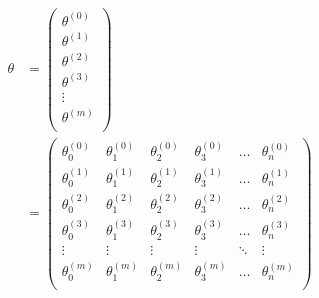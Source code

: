 \documentclass[12pt]{article}   %
\begin{document}
\begin{equation}
\begin{aligned}
\theta & = 
	\left(
		\begin{matrix}
			\theta^{(0)} \\
			\theta^{(1)} \\
			\theta^{(2)} \\
			\theta^{(3)} \\
			\vdots \\
			\theta^{(m)} \\
		\end{matrix}
	\right) \\
& =
	\left(
		\begin{matrix}
		\theta_0^{(0)} & \theta_1^{(0)} & \theta_2^{(0)} & \theta_3^{(0)} & \dots & \theta_n^{(0)} \\
		\theta_0^{(1)} & \theta_1^{(1)} & \theta_2^{(1)} & \theta_3^{(1)} & \dots & \theta_n^{(1)} \\
		\theta_0^{(2)} & \theta_1^{(2)} & \theta_2^{(2)} & \theta_3^{(2)} & \dots & \theta_n^{(2)} \\
		\theta_0^{(3)} & \theta_1^{(3)} & \theta_2^{(3)} & \theta_3^{(3)} & \dots & \theta_n^{(3)} \\
		\vdots    & \vdots    & \vdots    & \vdots    & \ddots & \vdots   \\
		\theta_0^{(m)} & \theta_1^{(m)} & \theta_2^{(m)} & \theta_3^{(m)} & \dots & \theta_n^{(m)} \\
		\end{matrix}
	\right)
\end{aligned}
\end{equation}
\end{document}
